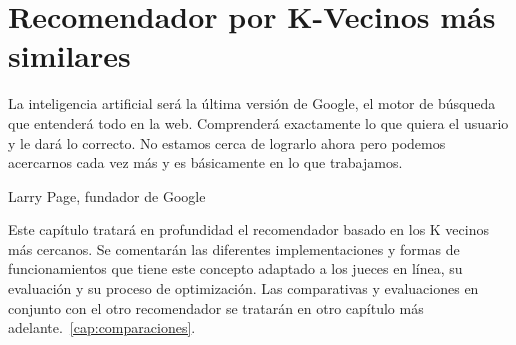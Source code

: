 %
%
%
%
%
%
%
%
%
%

\chapter{Recomendador por K-Vecinos más similares}
\label{cap3}

\begin{FraseCelebre}
\begin{Frase}
  La inteligencia artificial será la última versión de Google, el motor de búsqueda que entenderá todo en la web. Comprenderá exactamente lo que quiera el usuario y le dará lo correcto. No estamos cerca de lograrlo ahora pero podemos acercarnos cada vez más y es básicamente en lo que trabajamos.
\end{Frase}
\begin{Fuente}
Larry Page, fundador de Google
\end{Fuente}
\end{FraseCelebre}

\begin{resumen}
  Este capítulo tratará en profundidad el recomendador basado en los K vecinos más cercanos. Se comentarán las diferentes implementaciones y formas de funcionamientos que tiene este concepto adaptado a los jueces en línea, su evaluación y su proceso de optimización. Las comparativas y evaluaciones en conjunto con el otro recomendador se tratarán en otro capítulo más adelante.~\ref{cap:comparaciones}.
\end{resumen}

